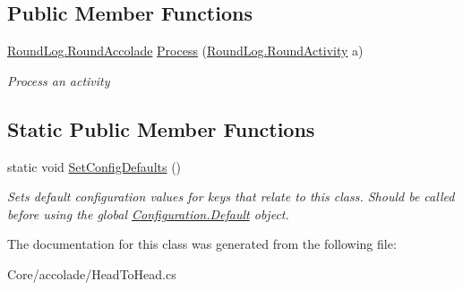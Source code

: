 \subsection*{Public Member Functions}
\begin{DoxyCompactItemize}
\item 
\hypertarget{class_m_b_c_1_1_core_1_1mbc_1_1accolade_1_1_head_to_head_afd0bb6e5b731cdd4a638a0b91445193f}{\hyperlink{class_m_b_c_1_1_core_1_1_round_log_a4060830ca7135aa755ec5b6d24aa30e6}{Round\-Log.\-Round\-Accolade} \hyperlink{class_m_b_c_1_1_core_1_1mbc_1_1accolade_1_1_head_to_head_afd0bb6e5b731cdd4a638a0b91445193f}{Process} (\hyperlink{class_m_b_c_1_1_core_1_1_round_log_1_1_round_activity}{Round\-Log.\-Round\-Activity} a)}\label{class_m_b_c_1_1_core_1_1mbc_1_1accolade_1_1_head_to_head_afd0bb6e5b731cdd4a638a0b91445193f}

\begin{DoxyCompactList}\small\item\em Process an activity\end{DoxyCompactList}\end{DoxyCompactItemize}
\subsection*{Static Public Member Functions}
\begin{DoxyCompactItemize}
\item 
\hypertarget{class_m_b_c_1_1_core_1_1mbc_1_1accolade_1_1_head_to_head_af85c60c95ba890123296f9bac0358947}{static void \hyperlink{class_m_b_c_1_1_core_1_1mbc_1_1accolade_1_1_head_to_head_af85c60c95ba890123296f9bac0358947}{Set\-Config\-Defaults} ()}\label{class_m_b_c_1_1_core_1_1mbc_1_1accolade_1_1_head_to_head_af85c60c95ba890123296f9bac0358947}

\begin{DoxyCompactList}\small\item\em Sets default configuration values for keys that relate to this class. Should be called before using the global \hyperlink{class_m_b_c_1_1_core_1_1_configuration_a5db184730b6c51c2ae617d0fc1976c13}{Configuration.\-Default} object.\end{DoxyCompactList}\end{DoxyCompactItemize}


The documentation for this class was generated from the following file\-:\begin{DoxyCompactItemize}
\item 
Core/accolade/Head\-To\-Head.\-cs\end{DoxyCompactItemize}
